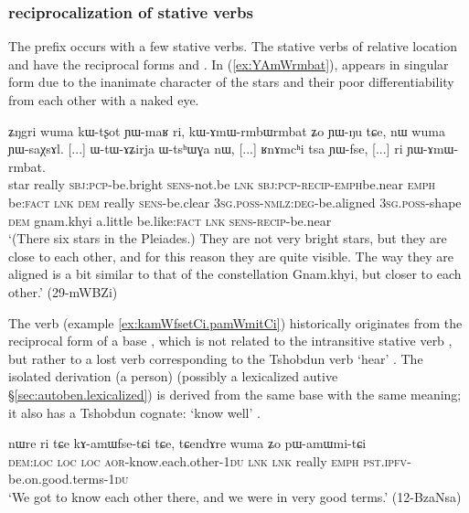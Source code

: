 \subsubsection{ reciprocalization of stative verbs} \label{sec:amW.stative}
The  prefix occurs with a few stative verbs. The stative verbs of relative location  and   have the reciprocal forms   and . In (\ref{ex:YAmWrmbat}),  appears in singular form due to the inanimate character of the stars and their poor differentiability from each other with a naked eye.

\begin{exe}
\ex \label{ex:YAmWrmbat}
\gll ʑŋgri wuma kɯ-tʂot ɲɯ-maʁ ri, kɯ-ɤmɯ-rmbɯ\redp{}rmbat ʑo ɲɯ-ŋu tɕe, nɯ wuma ɲɯ-saχsɤl. [...] ɯ-tɯ-ɤʑirja ɯ-tsʰɯɣa nɯ, [...] ʁnɤmcʰi tsa ɲɯ-fse, [...] ri ɲɯ-ɤmɯ-rmbat. \\
star really  \textsc{sbj}:\textsc{pcp}-be.bright \textsc{sens}-not.be \textsc{lnk} \textsc{sbj}:\textsc{pcp}-\textsc{recip}-\textsc{emph}\redp{}be.near \textsc{emph} be:\textsc{fact} \textsc{lnk} \textsc{dem} really \textsc{sens}-be.clear { } \textsc{3sg}.\textsc{poss}-\textsc{nmlz}:\textsc{deg}-be.aligned \textsc{3sg}.\textsc{poss}-shape \textsc{dem} {  } gnam.khyi a.little be.like:\textsc{fact} {  } \textsc{lnk} \textsc{sens}-\textsc{recip}-be.near \\
\glt `(There six stars in the Pleiades.) They are not very bright stars, but they are close to each other, and for this reason they are quite visible. The way they are aligned is a bit similar to that of the constellation Gnam.khyi, but closer to each other.' (29-mWBZi)
\end{exe}

The verb  (example \ref{ex:kamWfsetCi.pamWmitCi}) historically originates from the  reciprocal form of a base , which is not related to the intransitive stative verb , but rather to a lost verb corresponding to the Tshobdun verb  `hear' \citep[213]{jackson19tshobdun}. The isolated derivation  (a person) (possibly a lexicalized autive §\ref{sec:autoben.lexicalized}) is derived from the same base with the same meaning; it also has a Tshobdun cognate:  `know well' \citep[121]{jackson19tshobdun}.

\begin{exe}
\ex \label{ex:kamWfsetCi.pamWmitCi}
\gll  nɯre ri tɕe kɤ-amɯfse-tɕi tɕe, tɕendɤre wuma ʑo pɯ-amɯmi-tɕi \\
\textsc{dem}:\textsc{loc} \textsc{loc} \textsc{loc} \textsc{aor}-know.each.other-\textsc{1du} \textsc{lnk} \textsc{lnk} really \textsc{emph} \textsc{pst}.\textsc{ipfv}-be.on.good.terms-\textsc{1du} \\
\glt  `We got to know each other there, and we were in very good terms.' (12-BzaNsa) 
\end{exe}

